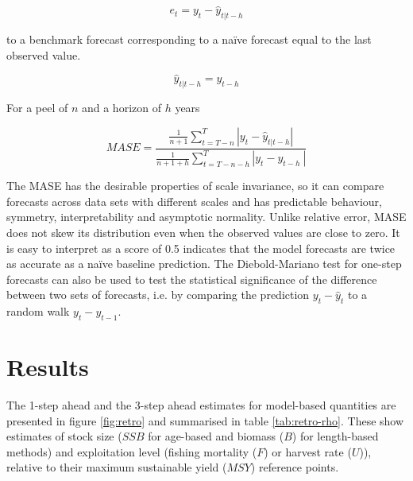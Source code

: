 \documentclass[11pt,a4paper]{article}
\begin{document}
{\begin{equation}
\label{eqn:err}
 e_t = y_t -\hat{y}_{t|t-h} 
\end{equation}

\noindent 
to a benchmark forecast corresponding to a na\"{i}ve forecast equal to the last observed value. 

\begin{equation} 
\hat{y}_{t|t-h}=y_{t-h}
\end{equation}

\noindent For a peel of $n$ and a horizon of $h$ years

\begin{equation}
\label{eqn:skill}
MASE=\frac{\frac{1}{n+1}\sum_{t=T-n}^{T} \left| y_t - \hat{y}_{t|t-h} \right|}{\frac{1}{n+1+h}\sum_{t=T-n-h}^{T} \left| y_{t} - {y}_{t-h}\ \right|}
\end{equation}

The MASE has the desirable properties of scale invariance, so it can compare forecasts across data sets with different scales and has predictable behaviour, symmetry, interpretability and asymptotic normality. Unlike relative error, MASE does not skew its distribution even when the observed values are close to zero. It is easy to interpret as a score of 0.5 indicates that the model forecasts are twice as accurate as a na\"{i}ve baseline prediction. The Diebold-Mariano test \citep{diebold1995comparing} for one-step forecasts can also be used to test the statistical significance of the difference between two sets of forecasts, i.e. by comparing the prediction $y_t -\hat{y}_t$ to a random walk $y_t-y_{t-1}$. 

\section{Results}

The 1-step ahead and the 3-step ahead estimates for model-based quantities are presented in figure \ref{fig:retro} and summarised in table \ref{tab:retro-rho}. These show estimates of stock size ($SSB$ for age-based and biomass ($B$) for length-based methods) and exploitation level (fishing mortality ($F$) or harvest rate ($U$)), relative to their maximum sustainable yield ($MSY$) reference points.

}
\end{document}
